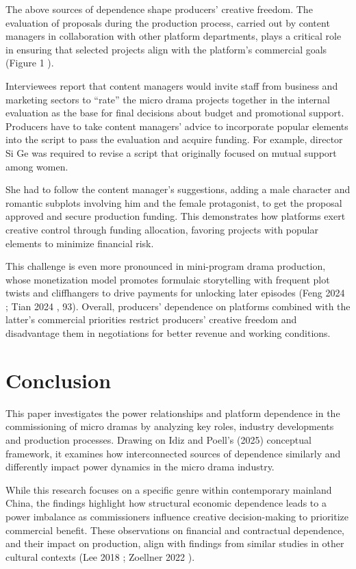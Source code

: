 \documentclass[10pt,a4paper]{article}
\begin{document}
The above sources of dependence shape producers’ creative freedom. The evaluation of proposals during the production process, carried out by content managers in collaboration with other platform departments, plays a critical role in ensuring that selected projects align with the platform’s commercial goals (Figure 1 ).\par
Interviewees report that content managers would invite staff from business and marketing sectors to “rate” the micro drama projects together in the internal evaluation as the base for final decisions about budget and promotional support. Producers have to take content managers’ advice to incorporate popular elements into the script to pass the evaluation and acquire funding. For example, director Si Ge was required to revise a script that originally focused on mutual support among women.\par
She had to follow the content manager’s suggestions, adding a male character and romantic subplots involving him and the female protagonist, to get the proposal approved and secure production funding. This demonstrates how platforms exert creative control through funding allocation, favoring projects with popular elements to minimize financial risk.\par
This challenge is even more pronounced in mini-program drama production, whose monetization model promotes formulaic storytelling with frequent plot twists and cliffhangers to drive payments for unlocking later episodes (Feng 2024 ; Tian 2024 , 93). Overall, producers’ dependence on platforms combined with the latter’s commercial priorities restrict producers’ creative freedom and disadvantage them in negotiations for better revenue and working conditions.\par
\section*{Conclusion}
This paper investigates the power relationships and platform dependence in the commissioning of micro dramas by analyzing key roles, industry developments and production processes. Drawing on Idiz and Poell’s (2025) conceptual framework, it examines how interconnected sources of dependence similarly and differently impact power dynamics in the micro drama industry.\par
While this research focuses on a specific genre within contemporary mainland China, the findings highlight how structural economic dependence leads to a power imbalance as commissioners influence creative decision-making to prioritize commercial benefit. These observations on financial and contractual dependence, and their impact on production, align with findings from similar studies in other cultural contexts (Lee 2018 ; Zoellner 2022 ).\par
\end{document}
